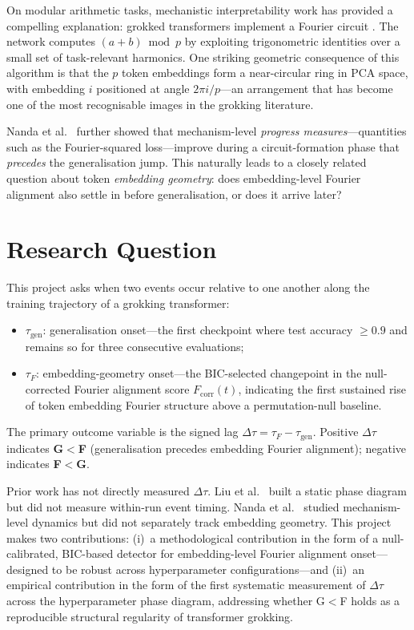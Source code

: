 \documentclass[12pt,openany,a4paper]{book}
\newcommand{\taug}{\tau_{\mathrm{gen}}}
\newcommand{\tauf}{\tau_{F}}
\newcommand{\Dtau}{\Delta\tau}
\newcommand{\fcorr}{F_{\mathrm{corr}}}
\begin{document}
On modular arithmetic tasks, mechanistic interpretability work has
provided a compelling explanation: grokked transformers implement a
Fourier circuit \cite{nanda2023progress}.
The network computes $(a+b)\bmod p$ by exploiting trigonometric
identities over a small set of task-relevant harmonics.
One striking geometric consequence of this algorithm is that the $p$ token embeddings form a near-circular ring in PCA space, with embedding $i$ positioned at angle $2\pi i/p$---an arrangement that has become one of the most recognisable images in the grokking literature.

Nanda et al.\ \cite{nanda2023progress} further showed that mechanism-level
\emph{progress measures}---quantities such as the Fourier-squared
loss---improve during a circuit-formation phase that \emph{precedes}
the generalisation jump.
This naturally leads to a closely related question about token \emph{embedding geometry}: does embedding-level Fourier alignment also settle in before generalisation, or does it arrive later?

\section{Research Question}

This project asks when two events occur relative to one another along the training trajectory of a grokking transformer:
\begin{itemize}
  \item $\taug$: generalisation onset---the first checkpoint where test
    accuracy $\geq 0.9$ and remains so for three consecutive evaluations;
  \item $\tauf$: embedding-geometry onset---the BIC-selected changepoint
    in the null-corrected Fourier alignment score $\fcorr(t)$, indicating
    the first sustained rise of token embedding Fourier structure above
    a permutation-null baseline.
\end{itemize}
The primary outcome variable is the signed lag $\Dtau = \tauf - \taug$.
Positive $\Dtau$ indicates \textbf{G$<$F} (generalisation precedes
embedding Fourier alignment); negative indicates \textbf{F$<$G}.

Prior work has not directly measured $\Dtau$.
Liu et al.\ \cite{liu2022towards} built a static phase diagram but did
not measure within-run event timing.
Nanda et al.\ \cite{nanda2023progress} studied mechanism-level dynamics
but did not separately track embedding geometry.
This project makes two contributions: (i)~a methodological contribution
in the form of a null-calibrated, BIC-based detector for embedding-level
Fourier alignment onset---designed to be robust across hyperparameter
configurations---and (ii)~an empirical contribution in the form of
the first systematic measurement of $\Dtau$ across the hyperparameter
phase diagram, addressing whether G$<$F holds as a reproducible
structural regularity of transformer grokking.
\end{document}
